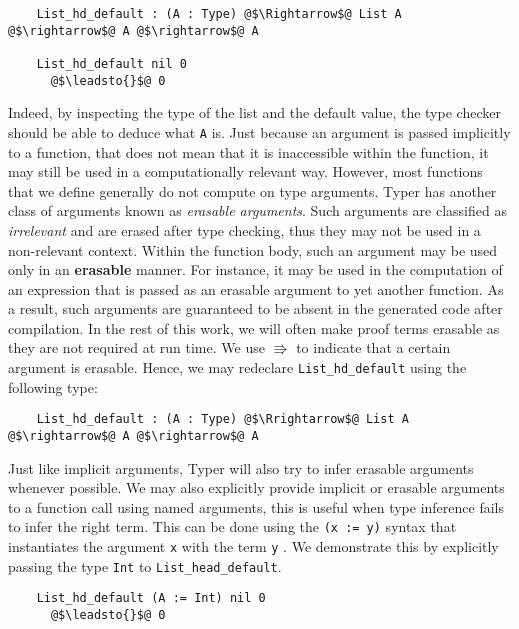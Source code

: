 \documentclass[12pt,twoside,maitrise]{dms}
\theoremstyle{definition}
\numberwithin{equation}{section}
\numberwithin{table}{chapter}
\numberwithin{figure}{chapter}
\newcommand\id[1] {\texttt{#1}}
\newcommand\fn[1] {\texttt{#1}}
\begin{document}
\begin{verbatim}
    List_hd_default : (A : Type) @$\Rightarrow$@ List A @$\rightarrow$@ A @$\rightarrow$@ A

    List_hd_default nil 0
      @$\leadsto{}$@ 0
\end{verbatim}

Indeed, by inspecting the type of the list and the default value, the type
checker should be able to deduce what \id{A} is. Just because an argument is
passed implicitly to a function, that does not mean that it is inaccessible
within the function, it may still be used in a computationally relevant way.
However, most functions that we define generally do not compute on type
arguments. Typer has another class of arguments known as \emph{erasable
arguments}. Such arguments are classified as \emph{irrelevant} and are erased
after type checking, thus they may not be used in a non-relevant context.
Within the function body, such an argument may be used only in an
\textbf{erasable} manner. For instance, it may be used in the computation of an
expression that is passed as an erasable argument to yet another function. As a
result, such arguments are guaranteed to be absent in the generated code after
compilation. In the rest of this work, we will often make proof terms erasable
as they are not required at run time. We use $\Rrightarrow$ to indicate that a
certain argument is erasable. Hence, we may redeclare \id{List_hd_default}
using the following type:

\begin{verbatim}
    List_hd_default : (A : Type) @$\Rrightarrow$@ List A @$\rightarrow$@ A @$\rightarrow$@ A
\end{verbatim}

Just like implicit arguments, Typer will also try to infer erasable arguments
whenever possible. We may also explicitly provide implicit or erasable
arguments to a function call using named arguments, this is useful when type
inference fails to infer the right term. This can be done using the \fn{(x :=
y)} syntax that instantiates the argument \id{x} with the term \id{y} . We
demonstrate this by explicitly passing the type \id{Int} to
\id{List_head_default}.

\begin{verbatim}
    List_hd_default (A := Int) nil 0
      @$\leadsto{}$@ 0
\end{verbatim}
\end{document}
